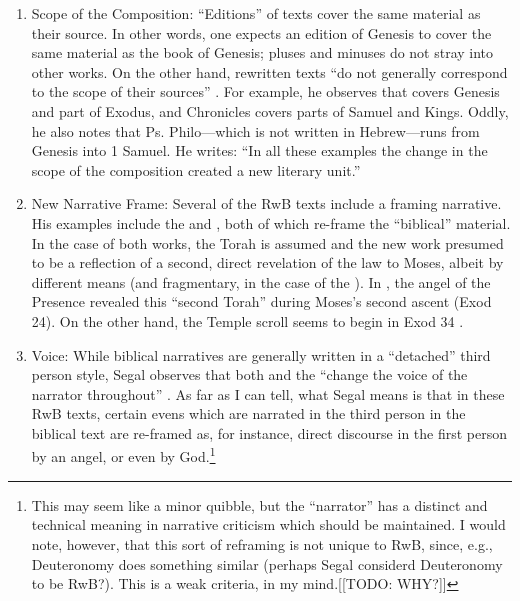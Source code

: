  \begin{enumerate} \def\labelenumi{\arabic{enumi}.} \item   Scope of the Composition: ``Editions'' of texts cover the same   material as their source. In other words, one expects an edition of   Genesis to cover the same material as the book of Genesis; pluses and   minuses do not stray into other works. On the other hand, rewritten   texts ``do not generally correspond to the scope of their sources''   \autocite[20]{segal_henze2005}. For example, he observes that   \jub covers Genesis and part of Exodus, and Chronicles   covers parts of Samuel and Kings. Oddly, he also notes that Ps.   Philo---which is not written in Hebrew---runs from Genesis into 1   Samuel. He writes: ``In all these examples the change in the scope of   the composition created a new literary unit.''   \autocite[20--21]{segal_henze2005} \item   New Narrative Frame: Several of the RwB texts include a framing   narrative. His examples include the \templescroll and   \jub, both of which re-frame the ``biblical''   material. In the case of both works, the Torah is assumed and the new   work presumed to be a reflection of a second, direct revelation of the   law to Moses, albeit by different means (and fragmentary, in the case   of the \templescroll). In \jub, the   angel of the Presence revealed this ``second Torah'' during Moses's   second ascent (Exod 24). On the other hand, the Temple scroll seems to   begin in Exod 34 \autocite[22]{segal_henze2005}. \item   Voice: While biblical narratives are generally written in a   ``detached'' third person style, Segal observes that both   \jub and the \templescroll ``change   the voice of the narrator throughout'' \autocite[22]{segal_henze2005}.   As far as I can tell, what Segal means is that in these RwB texts,   certain evens which are narrated in the third person in the biblical   text are re-framed as, for instance, direct discourse in the first   person by an angel, or even by God.\footnote{This may seem like a     minor quibble, but the ``narrator'' has a distinct and technical     meaning in narrative criticism which should be maintained. I would     note, however, that this sort of reframing is not unique to RwB,     since, e.g., Deuteronomy does something similar (perhaps Segal     considerd Deuteronomy to be RwB?). This is a weak criteria, in my     mind.[[TODO: WHY?]]} \end{enumerate} 

